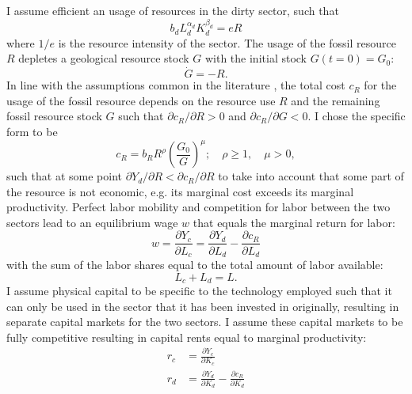I assume efficient an usage of resources in the dirty sector, such that
\begin{equation}
    b_d L_d^{\alpha_d}K_d^{\beta_d} = e R
    \label{eq:efficient_dirty_resources}
\end{equation}
where $1/e$ is the resource intensity of the sector. The usage of the fossil resource $R$ depletes a geological resource stock $G$ with the initial stock $G(t=0) = G_0$:
\begin{equation}
    \dot{G} = -R. 
    \label{eq:resource_depletion}
\end{equation} 
In line with the assumptions common in the literature \cite{Dasgupta1974, Perman2003}, the total cost $c_R$ for the usage of the fossil resource depends on the resource use $R$ and the remaining fossil resource stock $G$ such that $\partial c_R / \partial R >0$ and $\partial c_R / \partial G < 0$. I chose the specific form to be
\begin{equation}
	c_R = b_R R^{\rho}\left( \frac{G_0}{G} \right)^{\mu}; \quad \rho \geq 1, \quad \mu > 0,
	\label{eq:resource_cost}
\end{equation}
such that at some point $\partial Y_d / \partial R < \partial c_R / \partial R$ to take into account that some part of the resource is not economic, e.g. its marginal cost exceeds its marginal productivity.
Perfect labor mobility and competition for labor between the two sectors lead to an equilibrium wage $w$ that equals the marginal return for labor:
\begin{equation}
	w = \frac{\partial Y_c}{\partial L_c} = \frac{\partial Y_d}{\partial L_d} - \frac{\partial c_R}{\partial L_d}
	\label{eq:equilibrium_wage}
\end{equation}
with the sum of the labor shares equal to the total amount of labor available:
\begin{equation}
	L_c + L_d = L.
	\label{eq:population}
\end{equation}
I assume physical capital to be specific to the technology employed such that it can only be used in the sector that it has been invested in originally, resulting in separate capital markets for the two sectors. I assume these capital markets to be fully competitive resulting in capital rents equal to marginal productivity:
\begin{align}
	r_c &= \frac{\partial Y_c}{\partial K_c} \label{eq:clean_capital_rent}\\
	r_d &= \frac{\partial Y_d}{\partial K_d} - \frac{\partial c_R}{\partial K_d} \label{eq:dirty_capital_rent}
\end{align}


